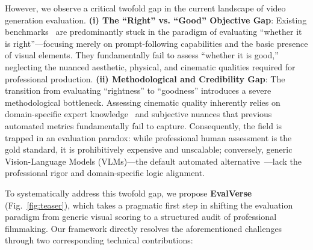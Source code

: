 \documentclass{article}
\begin{document}
However, we observe a critical twofold gap in the current landscape of video generation evaluation. 
\textbf{(i) The ``Right'' vs. ``Good'' Objective Gap}: Existing benchmarks~\cite{evalcrafter,vbench,vbench++,vbench2,univbench} are predominantly stuck in the paradigm of evaluating ``whether it is right''—focusing merely on prompt-following capabilities and the basic presence of visual elements. They fundamentally fail to assess ``whether it is good,'' neglecting the nuanced aesthetic, physical, and cinematic qualities required for professional production. 
\textbf{(ii) Methodological and Credibility Gap}: The transition from evaluating ``rightness'' to ``goodness'' introduces a severe methodological bottleneck. Assessing cinematic quality inherently relies on domain-specific expert knowledge~\cite{vadb} and subjective nuances that previous automated metrics fundamentally fail to capture. Consequently, the field is trapped in an evaluation paradox: while professional human assessment is the gold standard, it is prohibitively expensive and unscalable; conversely, generic Vision-Language Models (VLMs)—the default automated alternative~\cite{datbench}—lack the professional rigor and domain-specific logic alignment.

To systematically address this twofold gap, we propose \textbf{EvalVerse} (Fig.~\ref{fig:teaser}), which takes a pragmatic first step in shifting the evaluation paradigm from generic visual scoring to a structured audit of professional filmmaking. Our framework directly resolves the aforementioned challenges through two corresponding technical contributions:
\end{document}
